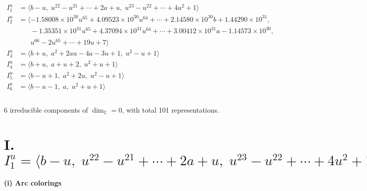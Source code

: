 \documentclass[1p]{elsarticle_modified}
\theoremstyle{definition}
\begin{document}
\begin{align*}
I^u_{1}&=\langle 
b- u,\;u^{22}- u^{21}+\cdots+2 a+u,\;u^{23}- u^{22}+\cdots+4 u^2+1\rangle \\
I^u_{2}&=\langle 
-1.58008\times10^{30} u^{65}+4.09523\times10^{30} u^{64}+\cdots+2.14580\times10^{30} b+1.44290\times10^{31},\\
\phantom{I^u_{2}}&\phantom{= \langle  }-1.35351\times10^{31} u^{65}+4.37094\times10^{31} u^{64}+\cdots+3.00412\times10^{31} a-1.14573\times10^{30},\\
\phantom{I^u_{2}}&\phantom{= \langle  }u^{66}-2 u^{65}+\cdots+19 u+7\rangle \\
I^u_{3}&=\langle 
b+u,\;a^2+2 a u-4 a-3 u+1,\;u^2- u+1\rangle \\
I^u_{4}&=\langle 
b+u,\;a+u+2,\;u^2+u+1\rangle \\
I^u_{5}&=\langle 
b- u+1,\;a^2+2 u,\;u^2- u+1\rangle \\
I^u_{6}&=\langle 
b- u-1,\;a,\;u^2+u+1\rangle \\
\\
\end{align*}
\raggedright * 6 irreducible components of $\dim_{\mathbb{C}}=0$, with total 101 representations.\\
\newpage
\renewcommand{\arraystretch}{1}
\centering \section*{I. $I^u_{1}= \langle b- u,\;u^{22}- u^{21}+\cdots+2 a+u,\;u^{23}- u^{22}+\cdots+4 u^2+1 \rangle$}
\flushleft \textbf{(i) Arc colorings}\\
\end{document}
